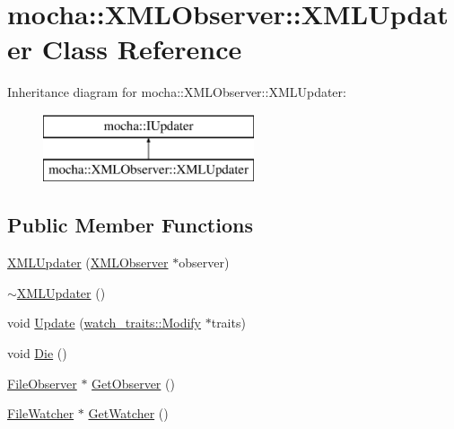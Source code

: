 \hypertarget{classmocha_1_1_x_m_l_observer_1_1_x_m_l_updater}{
\section{mocha::XMLObserver::XMLUpdater Class Reference}
\label{classmocha_1_1_x_m_l_observer_1_1_x_m_l_updater}
}
Inheritance diagram for mocha::XMLObserver::XMLUpdater:\begin{figure}[H]
\begin{center}
\leavevmode
\includegraphics[height=2.000000cm]{classmocha_1_1_x_m_l_observer_1_1_x_m_l_updater}
\end{center}
\end{figure}
\subsection*{Public Member Functions}
\begin{DoxyCompactItemize}
\item 
\hyperlink{classmocha_1_1_x_m_l_observer_1_1_x_m_l_updater_a66b4a73d2075c7c7ea6f15493024af93}{XMLUpdater} (\hyperlink{classmocha_1_1_x_m_l_observer}{XMLObserver} $\ast$observer)
\item 
\hyperlink{classmocha_1_1_x_m_l_observer_1_1_x_m_l_updater_a55d2a1fad337631a31bf119cd982a936}{$\sim$XMLUpdater} ()
\item 
void \hyperlink{classmocha_1_1_x_m_l_observer_1_1_x_m_l_updater_ab2d9bc54ead18acb65084d8405eb9570}{Update} (\hyperlink{structmocha_1_1watch__traits_1_1_modify}{watch\_\-traits::Modify} $\ast$traits)
\item 
void \hyperlink{classmocha_1_1_x_m_l_observer_1_1_x_m_l_updater_a337cc9a5191ace52ad8b651f0518ab12}{Die} ()
\item 
\hyperlink{classmocha_1_1_file_observer}{FileObserver} $\ast$ \hyperlink{classmocha_1_1_x_m_l_observer_1_1_x_m_l_updater_a4760142ca311fbf5e3e484691d6d6c9f}{GetObserver} ()
\item 
\hyperlink{classmocha_1_1_file_watcher}{FileWatcher} $\ast$ \hyperlink{classmocha_1_1_x_m_l_observer_1_1_x_m_l_updater_a36fcb475ffc1080ed9fe0b0e5615bade}{GetWatcher} ()
\end{DoxyCompactItemize}
